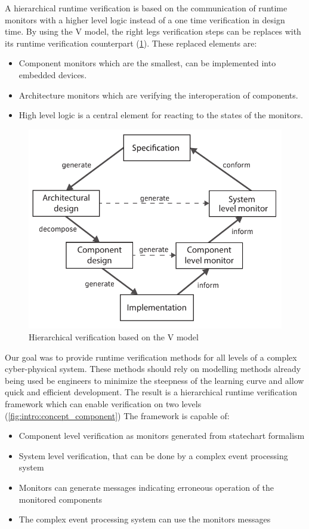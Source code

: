 A hierarchical runtime verification is based on the communication of runtime monitors with a higher level logic instead of a one time verification in design time. By using the V model, the right legs verification steps can be replaces with its runtime verification counterpart (\cref{fig:intro:rvmodel}).
These replaced elements are:
\begin{itemize}
	\item Component monitors which are the smallest, can be implemented into embedded devices.
	\item Architecture monitors which are verifying the interoperation of components.
	\item High level logic is a central element for reacting to the states of the monitors.
\end{itemize}

\begin{figure}[h]
	\centering
	\includegraphics[width=0.8\linewidth]{include/figures/chapter_1/rv_vmodel}
	\caption{Hierarchical verification based on the V model}
	\label{fig:intro:rvmodel}
\end{figure}


Our goal was to provide runtime verification methods for all levels of a complex cyber-physical system. These methods should rely on modelling methods already being used be engineers to minimize the steepness of the learning curve and allow quick and efficient development. The result is a hierarchical runtime verification framework which can enable verification on two levels (\cref{fig:intro:concept_component}) The framework is capable of:
\begin{itemize}
  \item Component level verification as monitors generated from statechart formalism
  \item System level verification, that can be done by a complex event processing system
  \item Monitors can generate messages indicating erroneous operation of the monitored components
  \item The complex event processing system can use the monitors messages
\end{itemize}


